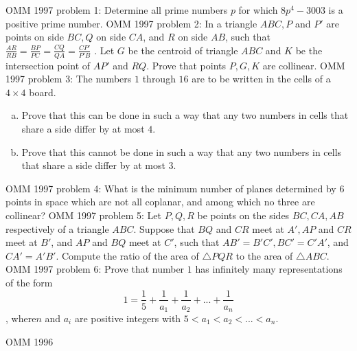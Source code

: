 OMM 1997 problem 1:  Determine all prime numbers $p$ for which $8p^4-3003$ is a positive prime number. 
OMM 1997 problem 2:  In a triangle $ABC, P$ and $P'$ are points on side $BC, Q$ on side $CA$, and $R $ on side $AB$, such that $\frac{AR}{RB}=\frac{BP}{PC}=\frac{CQ}{QA}=\frac{CP'}{P'B}$ . Let $G$ be the centroid of triangle $ABC$ and $K$ be the intersection point of $AP'$ and $RQ$. Prove that points $P,G,K$ are collinear. 
OMM 1997 problem 3:  The numbers $1$ through $16$ are to be written in the cells of a $4\times 4$ board.
\begin{enumerate}[(a)]
  \item Prove that this can be done in such a way that any two numbers in cells that share a side differ by at most $4$.
  \item Prove that this cannot be done in such a way that any two numbers in cells that share a side differ by at most $3$.
\end{enumerate} 
OMM 1997 problem 4:  What is the minimum number of planes determined by $6$ points in space which are not all coplanar, and among which no three are collinear? 
OMM 1997 problem 5:  Let $P,Q,R$ be points on the sides $BC,CA,AB$ respectively of a triangle $ABC$. Suppose that $BQ$ and $CR$ meet at $A', AP$ and $CR$ meet at $B'$, and $AP$ and $BQ$ meet at $C'$, such that $AB' = B'C', BC' =C'A'$, and $CA'= A'B'$. Compute the ratio of the area of $\triangle PQR$ to the area of $\triangle ABC$. 
OMM 1997 problem 6:  Prove that number $1$ has infinitely many representations of the form
\[ 1 =\frac{1}{5}+\frac{1}{a_1}+\frac{1}{a_2}+ ...+\frac{1}{a_n} \]
, where$ n$ and $a_i $ are positive integers with $5 < a_1 < a_2 < ... < a_n$. 

OMM 1996 

